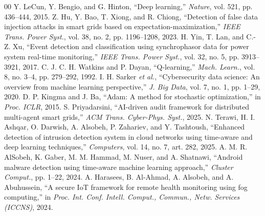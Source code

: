 \documentclass[conference,a4paper]{IEEEtran}
\begin{document}
\begin{thebibliography}{00}
 Y. LeCun, Y. Bengio, and G. Hinton, ``Deep learning,'' \textit{Nature}, vol. 521, pp. 436--444, 2015.
 Z. Hu, Y. Bao, T. Xiong, and R. Chiong, ``Detection of false data injection attacks in smart grids based on expectation-maximization,'' \textit{IEEE Trans. Power Syst.}, vol. 38, no. 2, pp. 1196--1208, 2023.
 H. Yin, T. Lan, and C.-Z. Xu, ``Event detection and classification using synchrophasor data for power system real-time monitoring,'' \textit{IEEE Trans. Power Syst.}, vol. 32, no. 5, pp. 3913--3921, 2017.
 C. J. C. H. Watkins and P. Dayan, ``Q-learning,'' \textit{Mach. Learn.}, vol. 8, no. 3--4, pp. 279--292, 1992.
 I. H. Sarker \textit{et al.}, ``Cybersecurity data science: An overview from machine learning perspective,'' \textit{J. Big Data}, vol. 7, no. 1, pp. 1--29, 2020.
 D. P. Kingma and J. Ba, ``Adam: A method for stochastic optimization,'' in \textit{Proc. ICLR}, 2015.
 S. Priyadarsini, ``AI-driven audit framework for distributed multi-agent smart grids,'' \textit{ACM Trans. Cyber-Phys. Syst.}, 2025.
 N. Terawi, H. I. Ashqar, O. Darwish, A. Alsobeh, P. Zahariev, and Y. Tashtoush, ``Enhanced detection of intrusion detection system in cloud networks using time-aware and deep learning techniques,'' \textit{Computers}, vol. 14, no. 7, art. 282, 2025.
 A. M. R. AlSobeh, K. Gaber, M. M. Hammad, M. Nuser, and A. Shatnawi, ``Android malware detection using time-aware machine learning approach,'' \textit{Cluster Comput.}, pp. 1--22, 2024.
 A. Harasees, B. Al-Ahmad, A. Alsobeh, and A. Abuhussein, ``A secure IoT framework for remote health monitoring using fog computing,'' in \textit{Proc. Int. Conf. Intell. Comput., Commun., Netw. Services (ICCNS)}, 2024.
\end{thebibliography}
\end{document}
